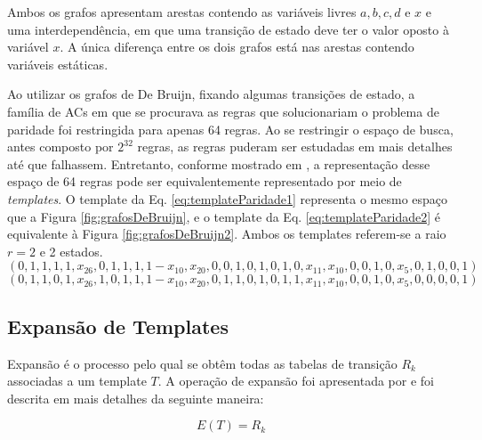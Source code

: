 Ambos os grafos apresentam arestas contendo as variáveis livres $a, b, c, d \text{ e } x$ e uma interdependência, em que uma transição de estado deve ter o valor oposto à variável $x$. A única diferença entre os dois grafos está nas arestas contendo variáveis estáticas.

Ao utilizar os grafos de De Bruijn, fixando algumas transições de estado, a família de ACs em que se procurava as regras que solucionariam o problema de paridade foi restringida para apenas 64 regras. Ao se restringir o espaço de busca, antes composto por $2^{32}$ regras, as regras puderam ser estudadas em mais detalhes até que falhassem. Entretanto, conforme mostrado em \cite{Verardo2014}, a representação desse espaço de 64 regras pode ser equivalentemente representado por meio de \textit{templates}. O template da Eq. \eqref{eq:templateParidade1} representa o mesmo espaço que a Figura \ref{fig:grafosDeBruijn}, e o template da Eq. \eqref{eq:templateParidade2} é equivalente à Figura \ref{fig:grafosDeBruijn2}. Ambos os templates referem-se a raio $r=2$ e 2 estados.
\begin{equation}
\left(0,1,1,1,1,x_{26},0,1,1,1,1-x_{10},x_{20},0,0,1,0,1,0,1,0,x_{11},x_{10},0,0,1,0,x_5,0,1,0,0,1\right)
\label{eq:templateParidade1}
\end{equation}
\begin{equation}
\left(0,1,1,0,1,x_{26},1,0,1,1,1-x_{10},x_{20},0,1,1,0,1,0,1,1,x_{11},x_{10},0,0,1,0,x_5,0,0,0,0,1\right)
\label{eq:templateParidade2}
\end{equation}


\newpage\newpage
\subsection{Expansão de Templates}
Expansão é o processo pelo qual se obtêm todas as tabelas de transição $R_k$ associadas a um template $T$.
A operação de expansão foi apresentada por  e foi descrita em mais detalhes da seguinte maneira:

\begin{equation}
E(T)=R_k
\end{equation}

